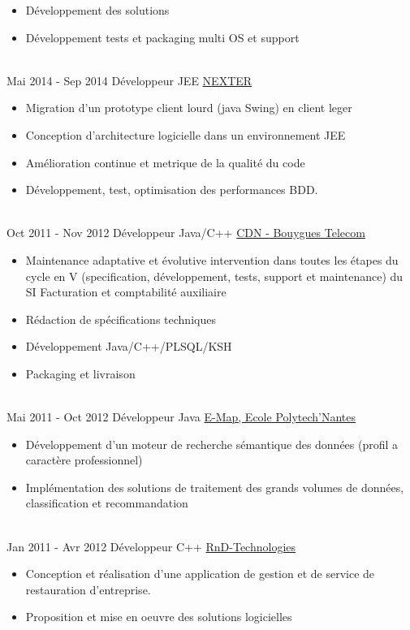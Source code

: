 \documentclass[letterpaper]{twentysecondcv} %
\begin{document}
\begin{twenty}
{\begin{itemize}
        \item Développement des solutions
        \item Développement tests et packaging multi OS et support
    	\end{itemize}
    	}
	\\   
		\twentyitem
		{Mai 2014 -}
		{Sep 2014}
		{Développeur JEE}
		{\href{https://www.nexter-group.fr/}{NEXTER}}
		{}
		{
		\begin{itemize}
		\item Migration d'un prototype client lourd (java Swing) en client leger
		\item Conception d'architecture logicielle dans un environnement JEE
		\item Amélioration continue et metrique de la qualité du code
		\item Développement, test, optimisation des performances BDD.
		\end{itemize}
		}       
       \\
	    \twentyitem
	    {Oct 2011 -}
	    {Nov 2012}
	    {Développeur Java/C++}
	    {\href{https://www.jobs.bouyguestelecom.fr/}{CDN - Bouygues Telecom}}
	    {}
	    {
	    \begin{itemize}
	    \item Maintenance adaptative et évolutive intervention dans toutes les étapes du cycle en V (specification, développement, tests, support et maintenance) du SI Facturation et comptabilité auxiliaire
	    \item Rédaction de spécifications techniques
	    \item Développement Java/C++/PLSQL/KSH
	    \item Packaging et livraison	
	    \end{itemize}
	    }
    
	   \\
	    \twentyitem
	    {Mai 2011 -}
	    {Oct 2012}
	    {Développeur Java}
	    {\href{}{E-Map, Ecole Polytech'Nantes}}
	    {}
	    {
	    \begin{itemize}
	    \item Développement d'un moteur de recherche sémantique des données (profil a caractère professionnel)
	    \item Implémentation des solutions de traitement des grands volumes de données, classification et recommandation	
	    \end{itemize}
	    }

	   \\
	    \twentyitem
	    {Jan 2011 -}
	    {Avr 2012}
	    {Développeur C++}
	    {\href{}{RnD-Technologies}}
	    {}
	    {
	    \begin{itemize}
		\item Conception et réalisation d'une application de gestion et de service de restauration d'entreprise.
		\item Proposition et mise en oeuvre des solutions logicielles	
	    \end{itemize}
	    }


\end{twenty}
\end{document}
